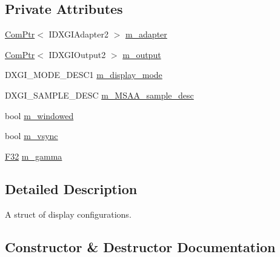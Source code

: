 \subsection*{Private Attributes}
\begin{DoxyCompactItemize}
\item 
\hyperlink{namespacemage_ae74f374780900893caa5555d1031fd79}{Com\+Ptr}$<$ I\+D\+X\+G\+I\+Adapter2 $>$ \hyperlink{structmage_1_1_display_configuration_a3a731fa68cb3924f0528115930073d77}{m\+\_\+adapter}
\item 
\hyperlink{namespacemage_ae74f374780900893caa5555d1031fd79}{Com\+Ptr}$<$ I\+D\+X\+G\+I\+Output2 $>$ \hyperlink{structmage_1_1_display_configuration_a483b3b999f4736084daa819a15adfb80}{m\+\_\+output}
\item 
D\+X\+G\+I\+\_\+\+M\+O\+D\+E\+\_\+\+D\+E\+S\+C1 \hyperlink{structmage_1_1_display_configuration_ac59d5e7c5553ef4842090bf1a83bd7ca}{m\+\_\+display\+\_\+mode}
\item 
D\+X\+G\+I\+\_\+\+S\+A\+M\+P\+L\+E\+\_\+\+D\+E\+SC \hyperlink{structmage_1_1_display_configuration_a1d4de267f8edcd0044252b9658f426c3}{m\+\_\+\+M\+S\+A\+A\+\_\+sample\+\_\+desc}
\item 
bool \hyperlink{structmage_1_1_display_configuration_a0c447e4bd7ea72313315c657e9cd0d95}{m\+\_\+windowed}
\item 
bool \hyperlink{structmage_1_1_display_configuration_a22dd3b35e58260c9555a37aef0e85a4d}{m\+\_\+vsync}
\item 
\hyperlink{namespacemage_aa97e833b45f06d60a0a9c4fc22ae02c0}{F32} \hyperlink{structmage_1_1_display_configuration_a6056d18cba04331488bb27eb033c783e}{m\+\_\+gamma}
\end{DoxyCompactItemize}


\subsection{Detailed Description}
A struct of display configurations. 

\subsection{Constructor \& Destructor Documentation}
\hypertarget{structmage_1_1_display_configuration_ad65b12ae3b6f5acaa7ed78df9ad3e2b7}{}\label{structmage_1_1_display_configuration_ad65b12ae3b6f5acaa7ed78df9ad3e2b7} 
